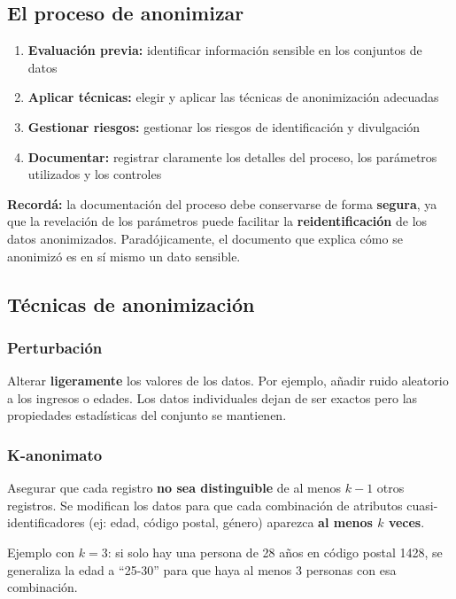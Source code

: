\documentclass[11pt, a4paper]{article}
\begin{document}
\subsection{El proceso de anonimizar}

\begin{enumerate}
	\item \textbf{Evaluación previa:} identificar información sensible en los conjuntos de datos
	\item \textbf{Aplicar técnicas:} elegir y aplicar las técnicas de anonimización adecuadas
	\item \textbf{Gestionar riesgos:} gestionar los riesgos de identificación y divulgación
	\item \textbf{Documentar:} registrar claramente los detalles del proceso, los parámetros utilizados y los controles
\end{enumerate}

\begin{recallbox}
	\textbf{Recordá:} la documentación del proceso debe conservarse de forma \textbf{segura}, ya que la revelación de los parámetros puede facilitar la \textbf{reidentificación} de los datos anonimizados. Paradójicamente, el documento que explica cómo se anonimizó es en sí mismo un dato sensible.
\end{recallbox}

\subsection{Técnicas de anonimización}

\subsubsection{Perturbación}
Alterar \textbf{ligeramente} los valores de los datos. Por ejemplo, añadir ruido aleatorio a los ingresos o edades. Los datos individuales dejan de ser exactos pero las propiedades estadísticas del conjunto se mantienen.

\subsubsection{K-anonimato}
Asegurar que cada registro \textbf{no sea distinguible} de al menos $k-1$ otros registros. Se modifican los datos para que cada combinación de atributos cuasi-identificadores (ej: edad, código postal, género) aparezca \textbf{al menos $k$ veces}.

Ejemplo con $k=3$: si solo hay una persona de 28 años en código postal 1428, se generaliza la edad a ``25-30'' para que haya al menos 3 personas con esa combinación.
\end{document}
